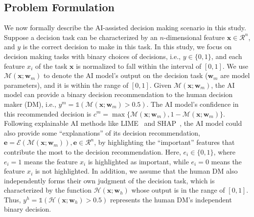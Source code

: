 \documentclass[letterpaper]{article} %
\begin{document}
\subsection{Problem Formulation}
We now formally describe the AI-assisted decision making scenario in this study. Suppose a decision task can be characterized by an $n$-dimensional feature $\bm{x} \in \mathcal{R}^{n}$, and $y$ is the correct decision to make in this task. In this study, we focus on decision making tasks with binary choices of decisions, i.e., $y \in \{0,1\}$, and each feature $x_i$ of the task $\bm{x}$ is normalized to fall within the interval of $[0,1]$. We use $\mathcal{M}(\bm{x};\bm{w}_m)$ to denote the AI model's output on the decision task ($\bm{w}_m$ are model parameters), and it is within the range of $[0,1]$. Given $\mathcal{M}(\bm{x};\bm{w}_m)$, the AI model can provide a binary decision recommendation to the human decision maker (DM), i.e., $y^m = \mathds{1}( \mathcal{M}(\bm{x};\bm{w}_m) > 0.5 )$.
 The AI model's confidence in this recommended decision is $c^m = \max \{\mathcal{M}(\bm{x};\bm{w}_m), 1-\mathcal{M}(\bm{x};\bm{w}_m)\}$. Following explainable AI methods like LIME~\cite{ribeiro2016should} and SHAP~\cite{lundberg2017unified}, the AI model could also provide some ``explanations'' of its decision recommendation, $\bm{e} = \mathcal{E}(\mathcal{M}(\bm{x};\bm{w}_m)), \bm{e} \in \mathcal{R}^{n}$, by
 highlighting the ``important'' features that contribute the most to the decision recommendation. Here, $e_i \in \{0,1\}$, where $e_i = 1$ means the feature $x_i$ is highlighted as important, while $e_i = 0$ means the feature $x_i$ is not highlighted.  In addition, we assume that the human DM also independently forms their own judgment of the decision task, which is characterized by the function $\mathcal{H}(\bm{x};\bm{w}_h)$ whose output is in the range of $[0,1]$.  Thus, $y^h = \mathds{1}( \mathcal{H}(\bm{x};\bm{w}_h) > 0.5 )$ represents the human DM's independent binary decision.
\end{document}
